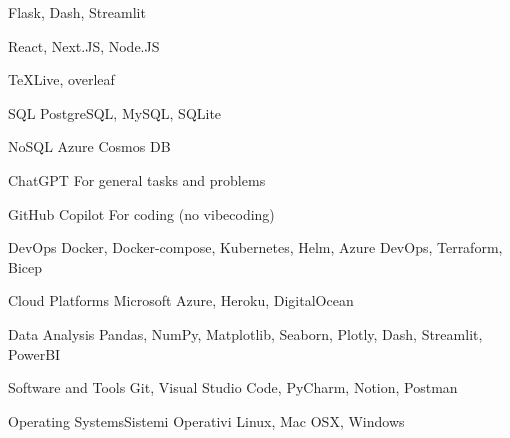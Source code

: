 

\begin{cvskills}
  {Flask, Dash, Streamlit}

  {React, Next.JS, Node.JS}

  {TeXLive, overleaf}

  {}

  {}

  {}

  {}

\end{cvskills}


\begin{cvskills}
  \cvskill
  {SQL}
  {PostgreSQL, MySQL, SQLite}

  \cvskill
  {NoSQL}
  {Azure Cosmos DB}

\end{cvskills}


\begin{cvskills}
    \cvskill
    {ChatGPT}
    {For general tasks and problems}
    
    \cvskill
    {GitHub Copilot}
    {For coding (no vibecoding)}



\end{cvskills}


\begin{cvskills}

\cvskill
{DevOps} %
{Docker, Docker-compose, Kubernetes, Helm, Azure DevOps, Terraform, Bicep} %

\cvskill
{Cloud Platforms} %
{Microsoft Azure, Heroku, DigitalOcean} %

\end{cvskills}





\begin{cvskills}
\cvskill
{Data Analysis}
{Pandas, NumPy, Matplotlib, Seaborn, Plotly, Dash, Streamlit, PowerBI} %


\cvskill
{Software and Tools} %
{Git, Visual Studio Code, PyCharm, Notion, Postman} %


\cvskill
{\ifenglish Operating Systems\else Sistemi Operativi\fi} %
{Linux, Mac OSX, Windows} %
\end{cvskills}